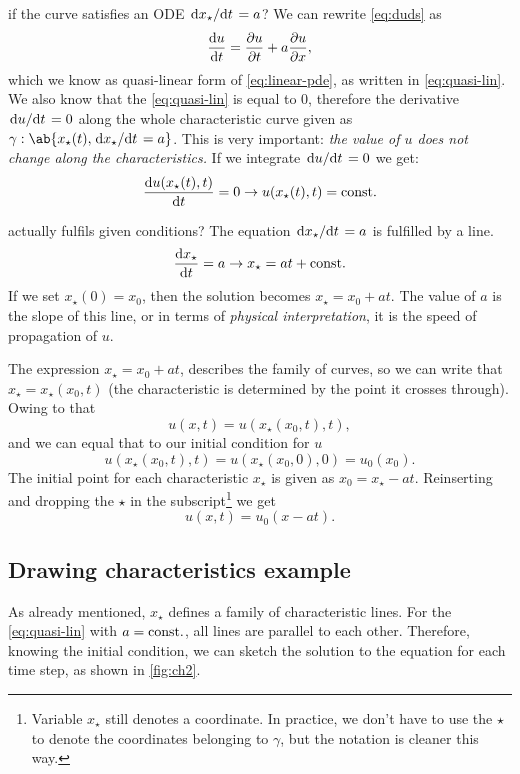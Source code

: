 \documentclass[justified, nobib, a4page]{tufte-handout}
\begin{document}
 if the curve satisfies an ODE 
\(\odv{x_\star}/{t} = a\)? We can rewrite \cref{eq:duds} as 
\[
  \odv{u}{t} =  \pdv{u}{t} + a\pdv{u}{x},
\]
which we know as quasi-linear form of \cref{eq:linear-pde}, as written in
\cref{eq:quasi-lin}. We also know that the \cref{eq:quasi-lin} is equal to 0,
therefore the derivative \(\odv{u}/{t} = 0\) along the whole characteristic
curve given as \(\gamma : \ab\{x_\star(t), \odv{x_\star}/{t} = a \}\). This is
very important: \emph{the value of \(u\) does not change along the
characteristics.} If we integrate \(\odv{u}/{t} = 0\) we get:
\[
  \odv{u(x_\star(t), t)}{t} = 0 \rightarrow u(x_\star(t), t) = \const
\]

 actually fulfils given conditions?
The equation \(\odv{x_\star}/{t} = a\) is fulfilled by a line.
\[
  \odv{x_\star}{t} = a\rightarrow x_\star = at + \const 
\]
If we set \(x_\star(0) = x_0\), then the solution becomes 
\(x_\star = x_0 + at\). The value of \(a\) is the slope of this line, or in
terms of \emph{physical interpretation}, it is the speed of propagation of
\(u\).

The expression \(x_\star = x_0 + at\), describes the family of curves, so we
can write that \(x_\star = x_\star(x_0, t)\) (the characteristic is determined
by the point it crosses through). Owing to that
\[
  u(x, t) = u(x_\star(x_0, t), t),
\]
and we can equal that to our initial condition for \(u\)
\[
  u(x_\star(x_0, t), t) = u(x_\star(x_0, 0), 0) = u_0(x_0).
\]
The initial point for each characteristic \(x_\star\) is given as \(x_0 =
x_\star - at\). Reinserting and dropping the \(\star\) in the
subscript\footnote{%
  Variable \(x_\star\) still denotes a coordinate. In practice, we don't have
  to use the \(\star\) to denote the coordinates belonging to \(\gamma\), but
  the notation is cleaner this way.}
we get
\[
  u(x, t) = u_0(x - at).
\]
\subsection{Drawing characteristics example}

As already mentioned, \(x_\star\) defines a family of characteristic lines. For
the \cref{eq:quasi-lin} with \(a=\mathrm{const.}\), all lines are parallel to each
other. Therefore, knowing the initial condition, we can sketch the solution to
the equation for each time step, as shown in \cref{fig:ch2}.
\end{document}
